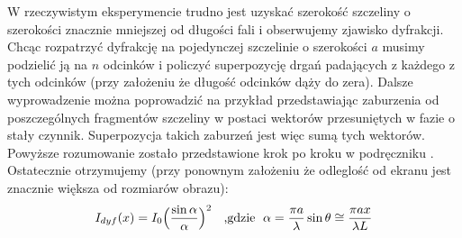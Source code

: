 \documentclass{article}
\begin{document}
W rzeczywistym eksperymencie trudno jest uzyskać szerokość szczeliny o szerokości znacznie mniejszej od długości fali i obserwujemy zjawisko dyfrakcji. Chcąc rozpatrzyć dyfrakcję na pojedynczej szczelinie o szerokości $a$ musimy podzielić ją na $n$ odcinków i policzyć superpozycję drgań padających z każdego z tych odcinków (przy założeniu że długość odcinków dąży do zera). Dalsze wyprowadzenie można poprowadzić na przykład przedstawiając zaburzenia od poszczególnych fragmentów szczeliny w postaci wektorów przesuniętych w fazie o stały czynnik. Superpozycja takich zaburzeń jest więc sumą tych wektorów. Powyższe rozumowanie zostało przedstawione krok po kroku w podręczniku \cite{5}. Ostatecznie otrzymujemy (przy ponownym założeniu że odleglość od ekranu jest znacznie większa od rozmiarów obrazu)\cite{1}:
\begin{equation}
I_{dyf}(x) = I_0\Big(\frac{\sin \alpha}{\alpha}\Big)^2\text{  \hspace{0.1cm} ,gdzie   \hspace{0.1cm}} \alpha=\frac{\pi a}{\lambda}\sin\theta \cong \frac{\pi a x}{\lambda L}
\label{wz_natezenie_dyfrakcyjne}
\end{equation}\\\\
\end{document}
